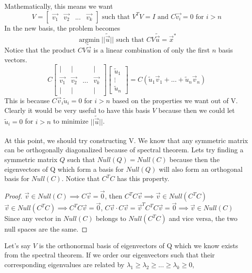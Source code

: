 \documentclass{article}
\newtheorem{proof}{Proof}
\DeclareMathOperator*{\argmin}{argmin}
\begin{document}
Mathematically, this means we want
\[
    V = \left[
        \begin{array}{cccc}
            \vec{v_1} & \vec{v_2} & ... & \vec{v_k}
        \end{array}
    \right] \text{ such that } V^TV=I \text{ and } C\vec{v_i} = 0\text{ for } i > n
\]
In the new basis, the problem becomes
\[
    \argmin{||\tilde{\vec{u}}||} \text{ such that } CV\tilde{\vec{u}}=\vec{x}^*
\]
Notice that the product $CV\tilde{\vec{u}}$ is a linear combination of only the first $n$ basis vectors.
\[
    C \left[
        \begin{array}{cccc}
            | & | & & |\\
            \vec{v_1} & \vec{v_2} & ... & \vec{v_k}\\
            | & | & & |
        \end{array}
    \right] \left[
        \begin{array}{c}
            \tilde{u}_1\\
            \vdots\\
            \tilde{u}_n
        \end{array}
    \right] = C (\tilde{u}_1\vec{v}_1+...+\tilde{u}_n\vec{v}_n)
\]
This is because $C\vec{v}_i\tilde{u}_i=0$ for $i>n$ based on the properties we want out of V.
Clearly it would be very useful to have this basis $V$ because then we could let $\tilde{u}_i=0$ for $i > n$ to minimize $||\tilde{\vec{u}}||$.
\\\\At this point, we should try constructing V. We know that any symmetric matrix can be orthogonally diagonalized because of spectral theorem.
Lets try finding a symmetric matrix $Q$ such that $Null(Q)=Null(C)$ because then the eigenvectors of Q which form a basis for $Null(Q)$ will also form an orthogonal basis for $Null(C)$. Notice that $C^TC$ has this property.
\begin{proof}
    $\vec{v}\in Null(C) \implies C\vec{v}=\vec{0}$, then $C^TC\vec{v} \implies \vec{v} \in Null(C^TC)$
    $\vec{v} \in Null(C^TC) \implies C^TC\vec{v}=\vec{0}$, $C\vec{v} \cdot C\vec{v}=\vec{v}^TC^TC\vec{v}=\vec{0}\implies \vec{v}\in Null(C)$
    Since any vector in $Null(C)$ belongs to $Null(C^TC)$ and vice versa, the two null spaces are the same.
\end{proof}
Let's say $V$ is the orthonormal basis of eigenvectors of Q which we know exists from the spectral theorem.
If we order our eigenvectors such that their corresponding eigenvalues are related by $\lambda_1 \ge \lambda_2 \ge ... \ge \lambda_k \ge 0$,
\end{document}
